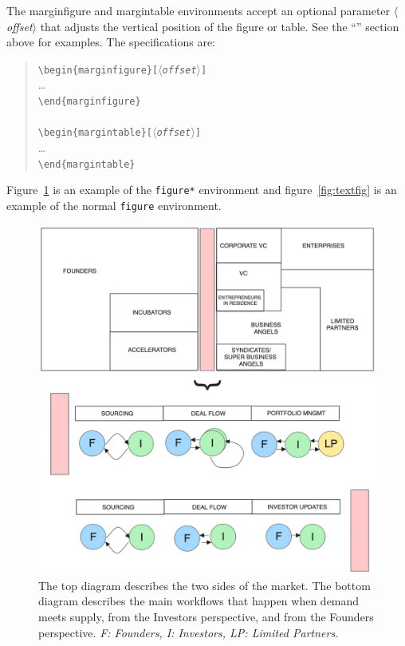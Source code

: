 \documentclass{tufte-handout}
\newcommand{\doccmd}[1]{\texttt{\textbackslash#1}}%
\newcommand{\docopt}[1]{\ensuremath{\langle}\textrm{\textit{#1}}\ensuremath{\rangle}}%
\newcommand{\docenv}[1]{\textsf{#1}}%
\newenvironment{docspec}{\begin{quote}\noindent}{\end{quote}}%
\begin{document}
The \docenv{marginfigure} and \docenv{margintable} environments accept an optional parameter \docopt{offset} that adjusts the vertical position of the figure or table.  See the ``'' section above for examples.  The specifications are:
\begin{docspec}
  \doccmd{begin\{marginfigure\}[\docopt{offset}]}\\
  \qquad\ldots\\
  \doccmd{end\{marginfigure\}}\\
  \mbox{}\\
  \doccmd{begin\{margintable\}[\docopt{offset}]}\\
  \qquad\ldots\\
  \doccmd{end\{margintable\}}\\
\end{docspec}

Figure~\ref{fig:fullfig} is an example of the \Verb|figure*|
environment and figure~\ref{fig:textfig} is an example of the normal
\Verb|figure| environment.

\begin{figure}[h]
  \includegraphics[width=\linewidth]{Fig-ecosystem-Drawing 2023-11-13 10.49.35.excalidraw.png}%
  \caption{The top diagram describes the two sides of the market. The bottom diagram describes the main workflows that 
  happen when demand meets supply, from the Investors perspective, and from the Founders perspective.
  \emph{F: Founders, I: Investors, LP: Limited Partners.}}
  \label{fig:fullfig}%
\end{figure}
\end{document}
